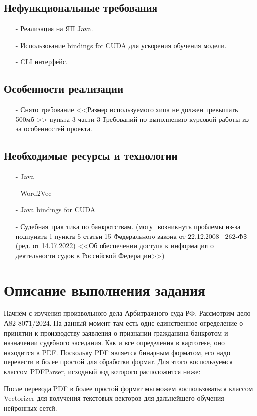 \documentclass[a4paper,12pt]{extarticle}
\begin{document}
\subsection{Нефункциональные требования} 
\begin{itemize}
    \item[-] Реализация на ЯП Java.
    \item[-] Использование bindings for CUDA для ускорения обучения модели.
    \item[-] CLI интерфейс.
\end{itemize}

 
\subsection{Особенности реализации}
\begin{itemize}
    \item[-] Снято требование <<Размер используемого хипа \ul{не должен} превышать 500мб >> пункта 3 части 3 Требований по выполнению курсовой работы из-за особенностей проекта.
\end{itemize}


\subsection{Необходимые ресурсы и технологии}
\begin{itemize}
    \item[-] Java
    \item[-] Word2Vec
    \item[-] Java bindings for CUDA
    \item[-] Судебная прак тика по банкротствам. (могут возникнуть проблемы из-за
        подпункта 1 пункта 5 статьи 15 Федерального закона от 22.12.2008
        \textnumero\ 262-ФЗ (ред. от 14.07.2022) <<Об обеспечении доступа к
        информации о деятельности судов в Российской Федерации>>)
\end{itemize}
 
\section{Описание выполнения задания}
Начнём с изучения произвольного дела Арбитражного суда РФ. Рассмотрим дело
А82-8071/2024. На данный момент там есть одно-единственное определение о принятии к производству заявления о признании гражданина банкротом
и назначении судебного заседания. Как и все определения в картотеке, оно
находится в PDF. Поскольку PDF является бинарным форматом, его надо перевести в более простой для
обработки формат. Для этого воспользуемся классом PDFParser, исходный код
которого расположится ниже:

После перевода PDF в более простой формат мы можем воспользоваться классом
Vectorizer для получения текстовых векторов для дальнейшего обучения нейронных сетей.

\end{document}
